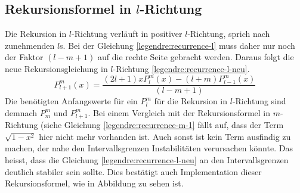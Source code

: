 \subsection{Rekursionsformel in $l$-Richtung
\label{legendre:subsection:lrichtung}}
Die Rekursion in $l$-Richtung verläuft in positiver $l$-Richtung, sprich nach zunehmenden $l$s.
Bei der Gleichung \eqref{legendre:recurrence-l} muss daher nur noch der Faktor $(l-m+1)$ auf die rechte Seite gebracht werden.
Daraus folgt die neue Rekursionsgleichung in $l$-Richtung \eqref{legendre:recurrence-l-neu}.
\begin{equation}
P^{m}_{l+1}(x)
= \frac{(2l+1)xP^{m}_{l}(x)-(l+m)P^{m}_{l-1}(x)}{(l-m+1)} 
\label{legendre:recurrence-l-neu}
\end{equation}
Die benötigten Anfangswerte für ein $P^{m}_{l}$ für die Rekursion in $l$-Richtung sind demnach $P^{m}_{m}$ und $P^{m}_{l+1}$.
Bei einem Vergleich mit der Rekursionsformel in $m$-Richtung (siehe Gleichung \eqref{legendre:recurrence-m-1} fällt auf, dass der Term $\sqrt{1-x^2}$ hier nicht mehr vorhanden ist.
Auch sonst ist kein Term ausfindig zu machen, der nahe den Intervallsgrenzen Instabilitäten verursachen könnte.
Das heisst, dass die Gleichung \eqref{legendre:recurrence-l-neu} an den Intervallsgrenzen deutlich stabiler sein sollte.
Dies bestätigt auch Implementation dieser Rekursionsformel, wie in Abbildung  zu sehen ist.




